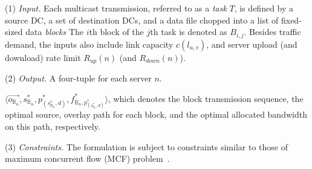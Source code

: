 
\noindent(1) {\em Input.} %
Each multicast transmission, referred to as a {\em task} $T$, is defined
by a source DC, a set of destination DCs, and a data file chopped into
a list of fixed-sized data
{\em blocks}
The $i$th block of the $j$th task is denoted as $B_{i,j}$.
Besides traffic demand, the inputs also include link capacity $c(l_{u,v})$, and
server upload (and download) rate limit $R_{up}(n)$ (and $R_{down}(n)$). %

\noindent(2) {\em Output.} A four-tuple for each server $n$.

$\langle \overrightarrow{o_{\mathbb{B}_n}}, s_{\mathbb{B}_n}^*, p^*_{(s^*_{\mathbb{B}_n},d)}, f^*_{\mathbb{B}_n,p^*_{(s^*_{\mathbb{B}_n},d)}} \rangle$, which denotes the block transmission sequence, the optimal source, overlay path for each block, and the optimal allocated bandwidth on this path, respectively. %

\noindent(3) {\em Constraints.}
The formulation is subject to constraints similar to those of maximum concurrent flow (MCF) problem~\cite{garg2007faster}.%

